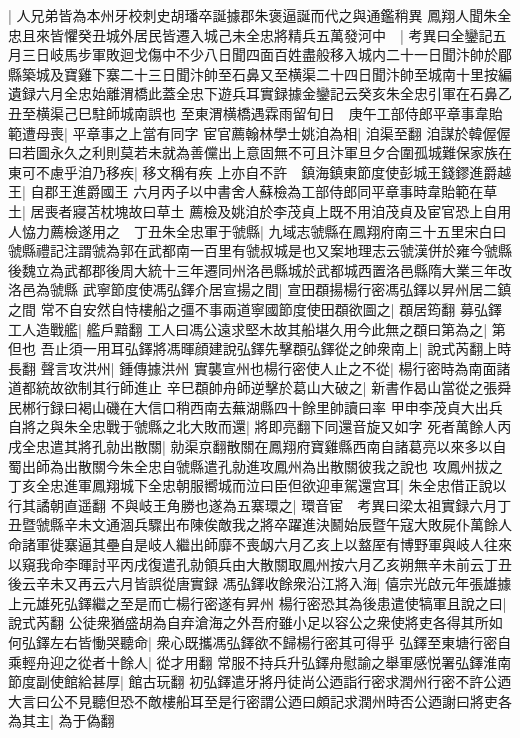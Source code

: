 |{
	人兄弟皆為本州牙校刺史胡璠卒誕據郡朱褒逼誕而代之與通鑑稍異}
鳳翔人聞朱全忠且來皆懼癸丑城外居民皆遷入城己未全忠將精兵五萬發河中　|{
	考異曰全鑾記五月三日岐馬步軍敗迴戈傷中不少八日聞四面百姓盡般移入城内二十一日聞汴帥於郿縣築城及寶雞下寨二十三日聞汴帥至石鼻又至横渠二十四日聞汴帥至城南十里按編遺録六月全忠始離渭橋此蓋全忠下遊兵耳實録據金鑾記云癸亥朱全忠引軍在石鼻乙丑至横渠己巳駐師城南誤也}
至東渭横橋遇霖雨留旬日　庚午工部侍郎平章事韋貽範遭母喪|{
	平章事之上當有同字}
宦官薦翰林學士姚洎為相|{
	洎渠至翻}
洎謀於韓偓偓曰若圖永久之利則莫若未就為善儻出上意固無不可且汴軍旦夕合圍孤城難保家族在東可不慮乎洎乃移疾|{
	移文稱有疾}
上亦自不許　鎮海鎮東節度使彭城王錢鏐進爵越王|{
	自郡王進爵國王}
六月丙子以中書舍人蘇檢為工部侍郎同平章事時韋貽範在草土|{
	居喪者寢苫枕塊故曰草土}
薦檢及姚洎於李茂貞上既不用洎茂貞及宦官恐上自用人恊力薦檢遂用之　丁丑朱全忠軍于虢縣|{
	九域志虢縣在鳳翔府南三十五里宋白曰虢縣禮記注謂虢為郭在武都南一百里有虢叔城是也又案地理志云虢漢併於雍今虢縣後魏立為武都郡後周大統十三年遷同州洛邑縣城於武都城西置洛邑縣隋大業三年改洛邑為虢縣}
武寧節度使馮弘鐸介居宣揚之間|{
	宣田頵揚楊行密馮弘鐸以昇州居二鎮之間}
常不自安然自恃樓船之彊不事兩道寧國節度使田頵欲圖之|{
	頵居筠翻}
募弘鐸工人造戰艦|{
	艦戶黯翻}
工人曰馮公遠求堅木故其船堪久用今此無之頵曰第為之|{
	第但也}
吾止須一用耳弘鐸將馮暉顔建說弘鐸先擊頵弘鐸從之帥衆南上|{
	說式芮翻上時長翻}
聲言攻洪州|{
	鍾傳據洪州}
實襲宣州也楊行密使人止之不從|{
	楊行密時為南面諸道都統故欲制其行師進止}
辛巳頵帥舟師逆擊於葛山大破之|{
	新書作曷山當從之張舜民郴行録曰褐山磯在大信口稍西南去蕪湖縣四十餘里帥讀曰率}
甲申李茂貞大出兵自將之與朱全忠戰于虢縣之北大敗而還|{
	將即亮翻下同還音旋又如字}
死者萬餘人丙戌全忠遣其將孔勍出散關|{
	勍渠京翻散關在鳳翔府寶雞縣西南自諸葛亮以來多以自蜀出師為出散關今朱全忠自虢縣遣孔勍進攻鳳州為出散關彼我之說也}
攻鳳州拔之丁亥全忠進軍鳳翔城下全忠朝服嚮城而泣曰臣但欲迎車駕還宫耳|{
	朱全忠借正說以行其譎朝直遥翻}
不與岐王角勝也遂為五寨環之|{
	環音宦　考異曰梁太祖實録六月丁丑暨虢縣辛未文通涸兵驟出布陳俟敵我之將卒躍進決鬭始辰暨午寇大敗屍仆萬餘人命諸軍徙寨逼其壘自是岐人繼出師靡不喪衂六月乙亥上以盩厔有博野軍與岐人往來以窺我命李暉討平丙戌復遣孔勍領兵由大散關取鳳州按六月乙亥朔無辛未前云丁丑後云辛未又再云六月皆誤從唐實録}
馮弘鐸收餘衆沿江將入海|{
	僖宗光啟元年張雄據上元雄死弘鐸繼之至是而亡楊行密遂有昇州}
楊行密恐其為後患遣使犒軍且說之曰|{
	說式芮翻}
公徒衆猶盛胡為自弃滄海之外吾府雖小足以容公之衆使將吏各得其所如何弘鐸左右皆慟哭聽命|{
	衆心既攜馮弘鐸欲不歸楊行密其可得乎}
弘鐸至東塘行密自乘輕舟迎之從者十餘人|{
	從才用翻}
常服不持兵升弘鐸舟慰諭之舉軍感悦署弘鐸淮南節度副使館給甚厚|{
	館古玩翻}
初弘鐸遣牙將丹徒尚公迺詣行密求潤州行密不許公迺大言曰公不見聽但恐不敵樓船耳至是行密謂公迺曰頗記求潤州時否公迺謝曰將吏各為其主|{
	為于偽翻}

